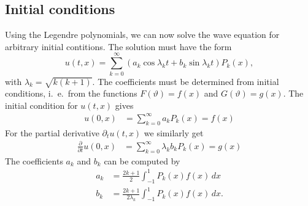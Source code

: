 \subsection{Initial conditions}
Using the Legendre polynomials, we can now solve the wave equation for
arbitrary initial contitions.
The solution must have the form
\[
u(t, x)=\sum_{k=0}^{\infty}(a_k\cos \lambda_k t+b_k\sin\lambda_k t)P_k(x),
\]
with $\lambda_k=\sqrt{k(k+1)}$.
The coefficients must be determined from initial conditions, i.~e.~from
the functions $F(\vartheta)=f(x)$ and $G(\vartheta)=g(x)$.
The initial condition for $u(t,x)$ gives
\begin{align*}
u(0,x)
&=\sum_{k=0}^{\infty} a_kP_k(x)=f(x)
\end{align*}
For the partial derivative $\partial_tu(t,x)$ we similarly get
\begin{align*}
\frac{\partial}{\partial t}u(0,x)
&=\sum_{k=0}^{\infty} \lambda_k b_kP_k(x)=g(x)
\end{align*}
The coefficients $a_k$ and $b_k$ can be computed by
\begin{align*}
a_k&=
\frac{2k+1}{2}\int_{-1}^1 P_k(x)f(x)\,dx
\\
b_k&=
\frac{2k+1}{2\lambda_k}\int_{-1}^1P_k(x)f(x)\,dx.
\end{align*}

